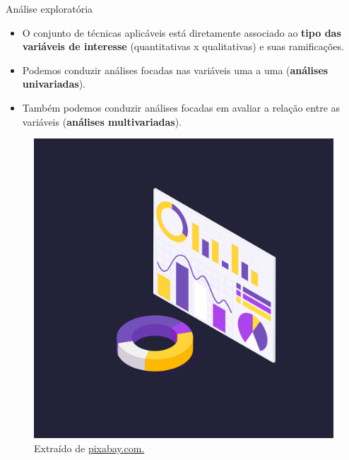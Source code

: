 \documentclass[
  ignorenonframetext,
  serif,
  professionalfont,
  usenames,
  dvipsnames,
  aspectratio = 169]{beamer}
\providecommand{\tightlist}{%
  \setlength{\itemsep}{0pt}\setlength{\parskip}{0pt}}
\renewcommand{\tightlist}{%
  \setlength{\itemsep}{0\baselineskip}
  \setlength{\parskip}{0.25\baselineskip}
}
\def\beginAHalfColumn{\begin{minipage}{0.49\textwidth}}%
\def\endColumns{\end{minipage}}%
\begin{document}
\begin{frame}{Análise exploratória}
\label{anuxe1lise-exploratuxf3ria-5}
\beginAHalfColumn

\begin{itemize}
\tightlist
\item
  O conjunto de técnicas aplicáveis está diretamente associado ao
  \textbf{tipo das variáveis de interesse} (quantitativas x
  qualitativas) e suas ramificações.
\end{itemize}

\vspace{0.3cm}

\begin{itemize}
\tightlist
\item
  Podemos conduzir análises focadas nas variáveis uma a uma
  (\textbf{análises univariadas}).
\end{itemize}

\vspace{0.3cm}

\begin{itemize}
\tightlist
\item
  Também podemos conduzir análises focadas em avaliar a relação entre as
  variáveis (\textbf{análises multivariadas}).
\end{itemize}

\endColumns
\beginAHalfColumn

\begin{figure}

{\centering \includegraphics[width=0.8\linewidth]{./img/exploratoria} 

}

\caption{Extraído de \href{https://cdn.pixabay.com/photo/2020/08/03/10/00/graph-5459708_1280.png}{pixabay.com.}}\label{fig:unnamed-chunk-32}
\end{figure}

\endColumns
\end{frame}
\end{document}
